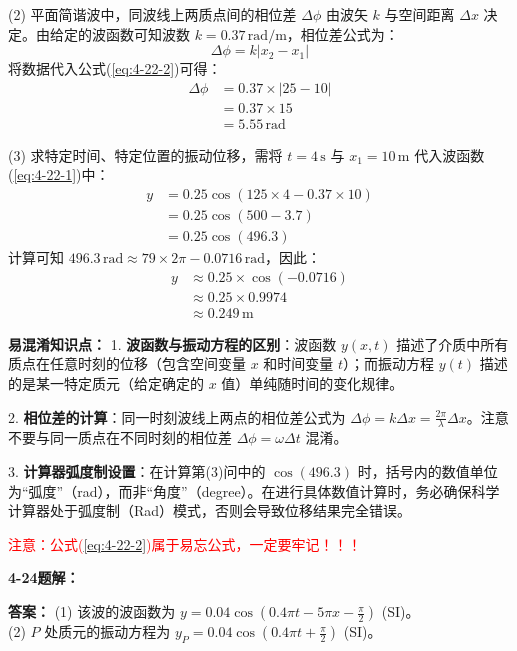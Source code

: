 (2) 平面简谐波中，同波线上两质点间的相位差 $\Delta \phi$ 由波矢 $k$ 与空间距离 $\Delta x$ 决定。由给定的波函数可知波数 $k = 0.37\,\text{rad/m}$，相位差公式为：
\begin{equation}\label{eq:4-22-2}
	\Delta \phi = k |x_2 - x_1|
\end{equation}
将数据代入公式(\ref{eq:4-22-2})可得：
\begin{align*}
	\Delta \phi &= 0.37 \times |25 - 10| \\
	&= 0.37 \times 15 \\
	&= 5.55\,\text{rad}
\end{align*}

(3) 求特定时间、特定位置的振动位移，需将 $t=4\,\text{s}$ 与 $x_1=10\,\text{m}$ 代入波函数(\ref{eq:4-22-1})中：
\begin{align*}
	y &= 0.25 \cos(125 \times 4 - 0.37 \times 10) \\
	&= 0.25 \cos(500 - 3.7) \\
	&= 0.25 \cos(496.3)
\end{align*}
计算可知 $496.3\,\text{rad} \approx 79 \times 2\pi - 0.0716\,\text{rad}$，因此：
\begin{align*}
	y &\approx 0.25 \times \cos(-0.0716) \\
	&\approx 0.25 \times 0.9974 \\
	&\approx 0.249\,\text{m}
\end{align*}

\textbf{易混淆知识点： }
1. \textbf{波函数与振动方程的区别}：波函数 $y(x,t)$ 描述了介质中所有质点在任意时刻的位移（包含空间变量 $x$ 和时间变量 $t$）；而振动方程 $y(t)$ 描述的是某一特定质元（给定确定的 $x$ 值）单纯随时间的变化规律。

2. \textbf{相位差的计算}：同一时刻波线上两点的相位差公式为 $\Delta \phi = k\Delta x = \frac{2\pi}{\lambda}\Delta x$。注意不要与同一质点在不同时刻的相位差 $\Delta \phi = \omega\Delta t$ 混淆。

3. \textbf{计算器弧度制设置}：在计算第(3)问中的 $\cos(496.3)$ 时，括号内的数值单位为“弧度”（rad），而非“角度”（degree）。在进行具体数值计算时，务必确保科学计算器处于弧度制（Rad）模式，否则会导致位移结果完全错误。

\textcolor{red}{注意：公式(\ref{eq:4-22-2})属于易忘公式，一定要牢记！！！}

\vspace{2em}

\textbf{4-24题解： }
\setcounter{equation}{0}
\renewcommand{\theHequation}{4-24.\arabic{equation}}

\textbf{答案： }
(1) 该波的波函数为 $y = 0.04 \cos(0.4\pi t - 5\pi x - \frac{\pi}{2})$ (SI)。\\
(2) $P$ 处质元的振动方程为 $y_P = 0.04 \cos(0.4\pi t + \frac{\pi}{2})$ (SI)。

